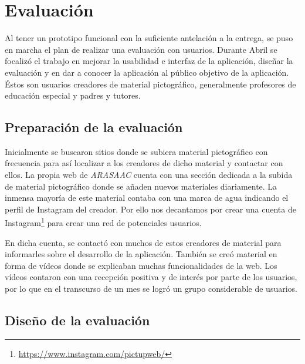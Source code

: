 \chapter{Evaluación}
\label{cap:evaluacion}



	

Al tener un prototipo funcional con la suficiente antelación a la entrega, se puso en marcha el plan de realizar una evaluación con usuarios. Durante Abril se focalizó el trabajo en mejorar la usabilidad e interfaz de la aplicación, diseñar la evaluación y en dar a conocer la aplicación al público objetivo de la aplicación. Éstos son usuarios creadores de material pictográfico, generalmente profesores de educación especial y padres y tutores. 


\section{Preparación de la evaluación}
\label{eva:prep}


Inicialmente se buscaron sitios donde se subiera material pictográfico con frecuencia para así localizar a los creadores de dicho material y contactar con ellos. La propia web de \textit{ARASAAC} cuenta con una sección dedicada a la subida de material pictográfico donde se añaden nuevos materiales diariamente. La inmensa mayoría de este material contaba con una marca de agua indicando el perfil de Instagram del creador. Por ello nos decantamos por crear una cuenta de Instagram\footnote{\url{https://www.instagram.com/pictupweb/}} para crear una red de potenciales usuarios. 

En dicha cuenta, se contactó con muchos de estos creadores de material para informarles sobre el desarrollo de la aplicación. También se creó material en forma de vídeos donde se explicaban muchas funcionalidades de la web. Los vídeos contaron con una recepción positiva y de interés por parte de los usuarios, por lo que en el transcurso de un mes se logró un grupo considerable de usuarios.
\section{Diseño de la evaluación}
\label{eva:dis}


